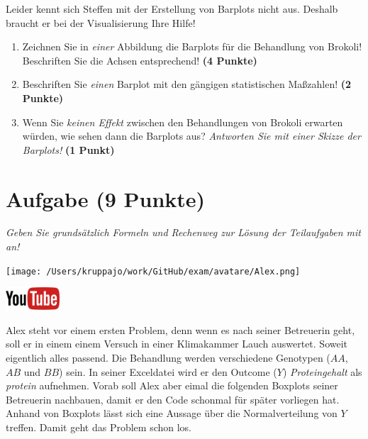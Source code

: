 \documentclass[a4paper, 9pt]{scrartcl}\usepackage[]{graphicx}\usepackage[]{xcolor}
\begin{document}
Leider kennt sich Steffen mit der Erstellung von Barplots nicht aus. Deshalb braucht er bei der Visualisierung Ihre Hilfe!

\begin{enumerate}
\item Zeichnen Sie in \textit{einer} Abbildung die Barplots für die
  Behandlung von Brokoli! Beschriften Sie die Achsen entsprechend!
  \textbf{(4 Punkte)}
\item Beschriften Sie \textit{einen} Barplot mit den gängigen
  statistischen Maßzahlen! \textbf{(2 Punkte)}
\item Wenn Sie \textit{keinen Effekt} zwischen den Behandlungen von
  Brokoli erwarten würden, wie sehen dann die Barplots aus?
  \textit{Antworten Sie mit einer Skizze der Barplots!}
  \textbf{(1 Punkt)}
\end{enumerate} 
\clearpage

\section{Aufgabe \hfill (9 Punkte)}

\textit{Geben Sie grundsätzlich Formeln und Rechenweg zur Lösung der Teilaufgaben mit an!} \\[1Ex]
 

 
\begin{minipage}[t]{0.5\textwidth}
\texttt{[image: /Users/kruppajo/work/GitHub/exam/avatare/Alex.png]}
\end{minipage}
\begin{minipage}[t]{0.5\textwidth}
\hfill
\href{https://youtu.be/Xf0yE-o7bEU}{\includegraphics[width = 2cm]{img/youtube}}\\[1Ex]
\end{minipage}
\vspace{1ex}



Alex steht vor einem ersten Problem, denn wenn es nach seiner Betreuerin geht, soll er in einem einem Versuch in einer Klimakammer Lauch auswertet. Soweit eigentlich alles passend. Die Behandlung werden verschiedene Genotypen ($AA$, $AB$ und $BB$) sein. In seiner Exceldatei wird er den Outcome ($Y$) \textit{Proteingehalt} als \textit{protein} aufnehmen. Vorab soll Alex aber eimal die folgenden Boxplots seiner Betreuerin nachbauen, damit er den \Rlogo Code schonmal für später vorliegen hat. Anhand von Boxplots lässt sich eine Aussage über die Normalverteilung von $Y$ treffen. Damit geht das Problem schon los.
\end{document}
